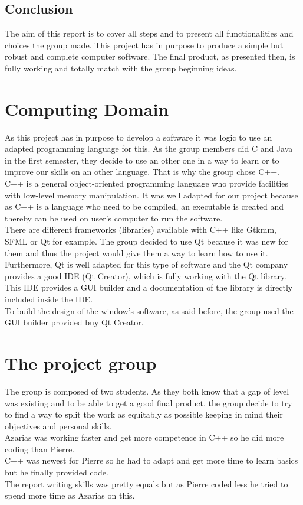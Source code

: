 \section{Conclusion}
The aim of this report is to cover all steps and to present all functionalities and choices the group made. This project has in purpose to produce a simple but robust and complete computer software. The final product, as presented then, is fully working and totally match with the group beginning ideas.  

\chapter{Computing Domain}
As this project has in purpose to develop a software it was logic to use an adapted programming language for this. As the group members did C and Java in the first semester, they decide to use an other one in a way to learn or to improve our skills on an other language. That is why the group chose C++.
\\
C++ is a general object-oriented programming language who provide facilities with low-level memory manipulation. It was well adapted for our project because as C++ is a language who need to be compiled, an executable is created and thereby can be used on user's computer to run the software. 
\\
There are different frameworks (libraries) available with C++ like Gtkmm, SFML or Qt for example. The group decided to use Qt because it was new for them and thus the project would give them a way to learn how to use it. Furthermore, Qt is well adapted for this type of software and the Qt company provides a good IDE (Qt Creator), which is fully working with the Qt library. This IDE provides a GUI builder and a documentation of the library is directly included inside the IDE. 
\\
To build the design of the window's software, as said before, the group used the GUI builder provided buy Qt Creator.

\chapter{The project group}
The group is composed of two students. As they both know that a gap of level was existing and to be able to get a good final product, the group decide to try to find a way to split the work as equitably as possible keeping in mind their objectives and personal skills.
\\
Azarias was working faster and get more competence in C++ so he did more coding than Pierre. 
\\
C++ was newest for Pierre so he had to adapt and get more time to learn basics but he finally provided code. 
\\
The report writing skills was pretty equals but as Pierre coded less he tried to spend more time as Azarias on this. 

